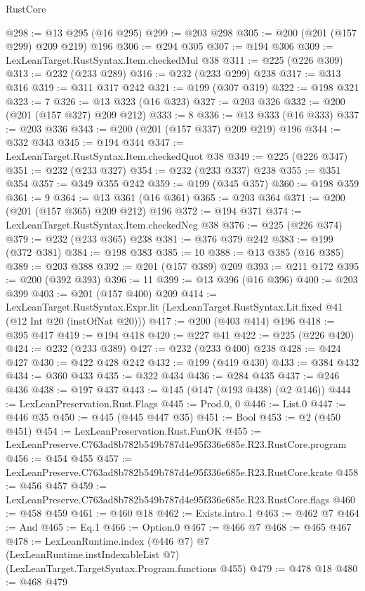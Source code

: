 \begin{lexlean}{RustCore}
\begin{coremodule}
@298 := @13 @295 (@16 @295)
@299 := @203 @298
@305 := @200 (@201 (@157 @299) @209 @219) @196
@306 := @294 @305
@307 := @194 @306
@309 := LexLeanTarget.RustSyntax.Item.checkedMul @38
@311 := @225 (@226 @309)
@313 := @232 (@233 @289)
@316 := @232 (@233 @299) @238
@317 := @313 @316
@319 := @311 @317 @242
@321 := @199 (@307 @319)
@322 := @198 @321
@323 := 7
@326 := @13 @323 (@16 @323)
@327 := @203 @326
@332 := @200 (@201 (@157 @327) @209 @212)
@333 := 8
@336 := @13 @333 (@16 @333)
@337 := @203 @336
@343 := @200 (@201 (@157 @337) @209 @219) @196
@344 := @332 @343
@345 := @194 @344
@347 := LexLeanTarget.RustSyntax.Item.checkedQuot @38
@349 := @225 (@226 @347)
@351 := @232 (@233 @327)
@354 := @232 (@233 @337) @238
@355 := @351 @354
@357 := @349 @355 @242
@359 := @199 (@345 @357)
@360 := @198 @359
@361 := 9
@364 := @13 @361 (@16 @361)
@365 := @203 @364
@371 := @200 (@201 (@157 @365) @209 @212) @196
@372 := @194 @371
@374 := LexLeanTarget.RustSyntax.Item.checkedNeg @38
@376 := @225 (@226 @374)
@379 := @232 (@233 @365) @238
@381 := @376 @379 @242
@383 := @199 (@372 @381)
@384 := @198 @383
@385 := 10
@388 := @13 @385 (@16 @385)
@389 := @203 @388
@392 := @201 (@157 @389) @209
@393 := @211 @172
@395 := @200 (@392 @393)
@396 := 11
@399 := @13 @396 (@16 @396)
@400 := @203 @399
@403 := @201 (@157 @400) @209
@414 := LexLeanTarget.RustSyntax.Expr.lit
    (LexLeanTarget.RustSyntax.Lit.fixed @41 (@12 Int @20 (instOfNat @20)))
@417 := @200 (@403 @414) @196
@418 := @395 @417
@419 := @194 @418
@420 := @227 @41
@422 := @225 (@226 @420)
@424 := @232 (@233 @389)
@427 := @232 (@233 @400) @238
@428 := @424 @427
@430 := @422 @428 @242
@432 := @199 (@419 @430)
@433 := @384 @432
@434 := @360 @433
@435 := @322 @434
@436 := @284 @435
@437 := @246 @436
@438 := @197 @437
@443 := @145 (@147 (@193 @438) (@2 @146))
@444 := LexLeanPreservation.Rust.Flags
@445 := Prod.{0, 0}
@446 := List.{0}
@447 := @446 @35
@450 := @445 (@445 @447 @35)
@451 := Bool
@453 := @2 (@450 @451)
@454 := LexLeanPreservation.Rust.FunOK
@455 := LexLeanPreserve.C763ad8b782b549b787d4e95f336e685e.R23.RustCore.program
@456 := @454 @455
@457 := LexLeanPreserve.C763ad8b782b549b787d4e95f336e685e.R23.RustCore.krate
@458 := @456 @457
@459 := LexLeanPreserve.C763ad8b782b549b787d4e95f336e685e.R23.RustCore.flags
@460 := @458 @459
@461 := @460 @18
@462 := Exists.intro.{1}
@463 := @462 @7
@464 := And
@465 := Eq.{1}
@466 := Option.{0}
@467 := @466 @7
@468 := @465 @467
@478 := LexLeanRuntime.index
    (@446 @7)
    @7
    (LexLeanRuntime.instIndexableList @7)
    (LexLeanTarget.TargetSyntax.Program.functions @455)
@479 := @478 @18
@480 := @468 @479

\end{coremodule}
\end{lexlean}
